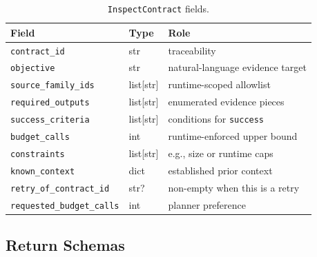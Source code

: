 \begin{table}[h]
\caption{\texttt{InspectContract} fields.}
\label{tab:inspect-contract}
\centering
\begin{tabular}{lll}
\toprule
Field & Type & Role \\
\midrule
\texttt{contract\_id} & str & traceability \\
\texttt{objective} & str & natural-language evidence target \\
\texttt{source\_family\_ids} & list[str] & runtime-scoped allowlist \\
\texttt{required\_outputs} & list[str] & enumerated evidence pieces \\
\texttt{success\_criteria} & list[str] & conditions for \texttt{success} \\
\texttt{budget\_calls} & int & runtime-enforced upper bound \\
\texttt{constraints} & list[str] & e.g., size or runtime caps \\
\texttt{known\_context} & dict & established prior context \\
\texttt{retry\_of\_contract\_id} & str? & non-empty when this is a retry \\
\texttt{requested\_budget\_calls} & int & planner preference \\
\bottomrule
\end{tabular}
\end{table}

\subsection{Return Schemas}

